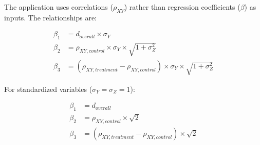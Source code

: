 \documentclass{article}
\begin{document}
The application uses correlations ($\rho_{XY}$) rather than regression coefficients ($\beta$) as inputs. The relationships are:

\begin{align}
\beta_1 &= d_{overall} \times \sigma_Y \\
\beta_2 &= \rho_{XY,control} \times \sigma_Y \times \sqrt{1 + \sigma_Z^2} \\
\beta_3 &= (\rho_{XY,treatment} - \rho_{XY,control}) \times \sigma_Y \times \sqrt{1 + \sigma_Z^2}
\end{align}

For standardized variables ($\sigma_Y = \sigma_Z = 1$):

\begin{align}
\beta_1 &= d_{overall} \\
\beta_2 &= \rho_{XY,control} \times \sqrt{2} \\
\beta_3 &= (\rho_{XY,treatment} - \rho_{XY,control}) \times \sqrt{2}
\end{align}
\end{document}
